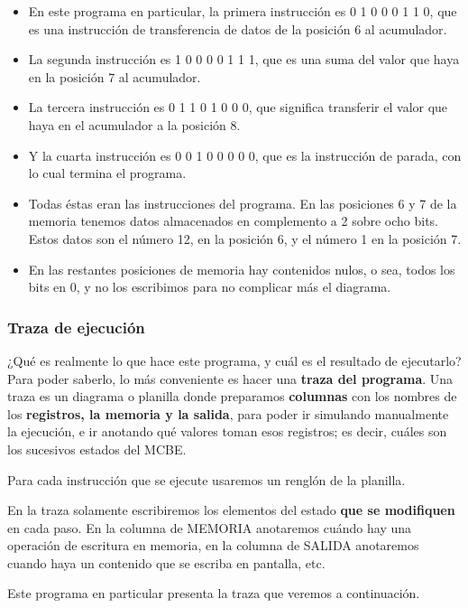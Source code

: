 \documentclass[spanish,A4,]{article}
\begin{document}
\begin{itemize}
\itemsep1pt\parskip0pt
\item
  En este programa en particular, la primera instrucción es 0 1 0 0 0 1 1 0,
  que es una instrucción de transferencia de datos de la posición 6 al
  acumulador.
\item
  La segunda instrucción es 1 0 0 0 0 1 1 1, que es una suma del valor que
  haya en la posición 7 al acumulador.
\item
  La tercera instrucción es 0 1 1 0 1 0 0 0, que significa transferir el valor
  que haya en el acumulador a la posición 8.
\item
  Y la cuarta instrucción es 0 0 1 0 0 0 0 0, que es la instrucción de parada,
  con lo cual termina el programa.
\item
  Todas éstas eran las instrucciones del programa. En las posiciones 6 y
  7 de la memoria tenemos datos almacenados en complemento a 2 sobre
  ocho bits. Estos datos son el número 12, en la posición 6, y el número
  1 en la posición 7.
\item
  En las restantes posiciones de memoria hay contenidos nulos, o sea,
  todos los bits en 0, y no los escribimos para no complicar más el
  diagrama.
\end{itemize}

\subsubsection{Traza de ejecución}\label{traza-de-ejecuciuxf3n}

¿Qué es realmente lo que hace este programa, y cuál es el resultado de
ejecutarlo? Para poder saberlo, lo más conveniente es hacer una
\textbf{traza del programa}. Una traza es un diagrama o planilla donde
preparamos \textbf{columnas} con los nombres de los \textbf{registros,
la memoria y la salida}, para poder ir simulando manualmente la
ejecución, e ir anotando qué valores toman esos registros; es decir,
cuáles son los sucesivos estados del MCBE.

Para cada instrucción que se ejecute usaremos un renglón de la planilla.

En la traza solamente escribiremos los elementos del estado \textbf{que
se modifiquen} en cada paso. En la columna de MEMORIA anotaremos cuándo
hay una operación de escritura en memoria, en la columna de SALIDA
anotaremos cuando haya un contenido que se escriba en pantalla, etc.

Este programa en particular presenta la traza que veremos a
continuación.
\end{document}
